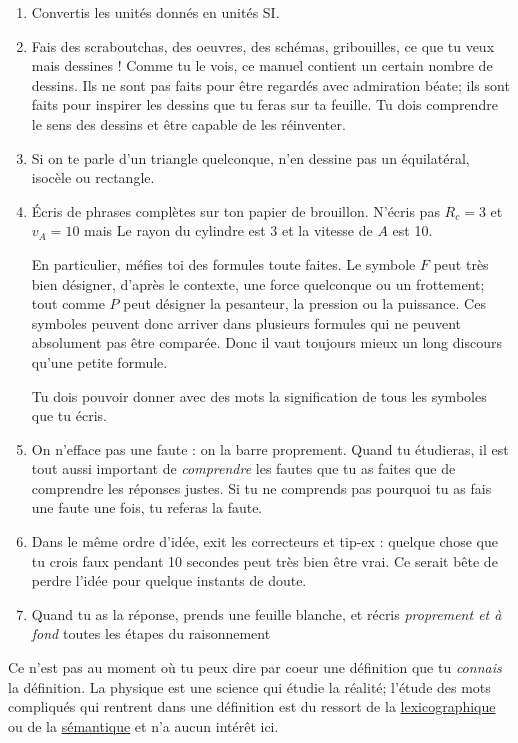 \documentclass[a4paper,12pt]{book}
\theoremstyle{mes_exemples}	\newtheorem{exemple}[numtho]{Exemple}
\theoremstyle{mes_tho}
\begin{document}
\begin{enumerate}
\item Convertis les unités donnés en unités SI. 
\item Fais des scraboutchas, des oeuvres, des schémas, gribouilles, ce que tu veux mais dessines !
    Comme tu le vois, ce manuel contient un certain nombre de dessins. Ils ne sont pas faits pour être regardés avec admiration béate; ils sont faits pour inspirer les dessins que tu feras sur ta feuille. Tu dois comprendre le sens des dessins et être capable de les réinventer.
\item Si on te parle d'un triangle quelconque, n'en dessine pas un équilatéral, isocèle ou rectangle.
\item Écris de phrases complètes sur ton papier de brouillon. N'écris pas \og $R_c=3$ et $v_A=10$ \fg{} mais \og Le rayon du cylindre est \unit{3}{\meter} et la vitesse de $A$ est \unit{10}{\meter\per\second}\fg.


En particulier, méfies toi des \og formules\fg{} toute faites. Le symbole $F$ peut très bien désigner,  d'après le contexte,  une force quelconque ou un frottement; tout comme $P$ peut désigner la pesanteur, la pression ou la puissance. Ces symboles peuvent donc arriver dans plusieurs formules qui ne peuvent absolument pas être comparée. Donc il vaut toujours mieux un long discours qu'une petite formule. 

Tu dois pouvoir donner avec des mots la signification de tous les symboles que tu écris.


\item On n'efface pas une faute : on la barre proprement. Quand tu étudieras, il est tout aussi important de \emph{comprendre} les fautes que tu as faites que de comprendre les réponses justes. Si tu ne comprends pas pourquoi tu as fais une faute une fois, tu referas la faute.
\item Dans le même ordre d'idée, exit les correcteurs et tip-ex : quelque chose que tu crois faux pendant 10 secondes peut très bien être vrai. Ce serait bête de perdre l'idée pour quelque instants de doute.
\item Quand tu as la réponse, prends une feuille blanche, et récris \emph{proprement et à fond} toutes les étapes du raisonnement
\end{enumerate}

Ce n'est pas au moment où tu peux dire par coeur une définition que tu  \emph{connais} la définition. La physique est une science qui étudie la réalité; l'étude des mots compliqués qui rentrent dans une définition est du ressort de la \href{http://fr.wikipedia.org/wiki/Lexicologie}{lexicographique} ou de la \href{http://fr.wikipedia.org/wiki/Sémantique}{sémantique} et n'a aucun intérêt ici.
\end{document}
